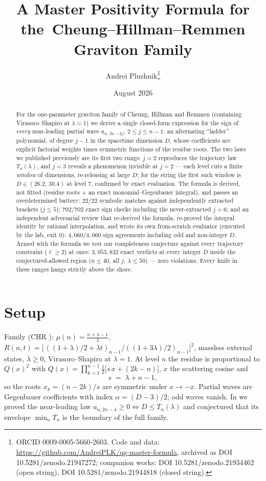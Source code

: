 \documentclass[11pt]{article}
\title{A Master Positivity Formula for the\ Cheung--Hillman--Remmen Graviton Family}
\author{Andrei Pluzhnik\thanks{ORCID 0009-0005-5660-2603. Code and data:
\url{https://github.com/AndreiPLK/qg-master-formula}, archived as DOI
10.5281/zenodo.21947272; companion works: DOI 10.5281/zenodo.21934462
(open string), DOI 10.5281/zenodo.21944818 (closed string).}}
\date{August 2026}
\begin{document}
\maketitle

\begin{abstract}
For the one-parameter graviton family of Cheung, Hillman and Remmen
(containing Virasoro--Shapiro at $\lambda=1$) we derive a single closed-form
expression for the sign of \emph{every} near-leading partial wave
$a_{n,\,2n-2j}$, $2\le j\le n-1$: an alternating ``ladder'' polynomial, of degree
$j{-}1$ in the spacetime dimension $D$, whose coefficients are explicit
factorial weights times symmetric functions of the residue roots. The two
laws we published previously are its first two rungs: $j{=}2$ reproduces the
trajectory law $T_n(\lambda)$, and $j{=}3$ reveals a phenomenon invisible at $j{=}2$ --- each
level cuts a finite \emph{window} of dimensions, re-releasing at large $D$;
for the string the first such window is $D\in(26.2,\,30.4)$ at level $7$,
confirmed by exact evaluation. The formula is derived, not fitted (residue
roots + an exact monomial--Gegenbauer integral), and passes an
overdetermined battery: $22/22$ symbolic matches against independently
extracted brackets ($j\le5$); $702/702$ exact sign checks including the
never-extracted $j{=}6$; and an independent adversarial review that
re-derived the formula, re-proved the integral identity by rational
interpolation, and wrote its own from-scratch evaluator (executed by the
lab, exit $0$): $4{,}060/4{,}060$
sign agreements including odd and non-integer $D$. Armed with the formula we
test our completeness conjecture against every trajectory constraint
($\ell\ge2$) at once: $3{,}053{,}832$ exact verdicts at every integer $D$
inside the conjectured-allowed region ($n\le40$, all $j$, $\lambda\le50$)
--- zero violations. Every knife in these ranges hangs strictly above the
shore.
\end{abstract}

\section{Setup}
Family (CHR \cite{CHR2024b}): $\mu(n)=\frac{n+\lambda-1}{\lambda}$,
$R(n,t)=\bigl[\,((1{+}\lambda)/2+\lambda t)_{n-1}/((1{+}3\lambda)/2)_{n-1}\bigr]^2$,
massless external states, $\lambda\ge0$, Virasoro--Shapiro at $\lambda=1$.
At level $n$ the residue is proportional to $Q(x)^2$ with
$Q(x)=\prod_{k=1}^{n-1}\tfrac12\bigl[s\,x+(2k{-}n)\bigr]$, $x$ the scattering
cosine and
\begin{equation}
s\;=\;\lambda+n-1 ,
\end{equation}
so the roots $x_k=(n-2k)/s$ are symmetric under $x\to-x$. Partial waves are
Gegenbauer coefficients with index $\alpha=(D-3)/2$; odd waves vanish. In
\cite{shore} we proved the near-leading law
$a_{n,2n-4}\ge0\iff D\le T_n(\lambda)$ and conjectured that its envelope
$\min_nT_n$ is the boundary of the full family.
\end{document}

